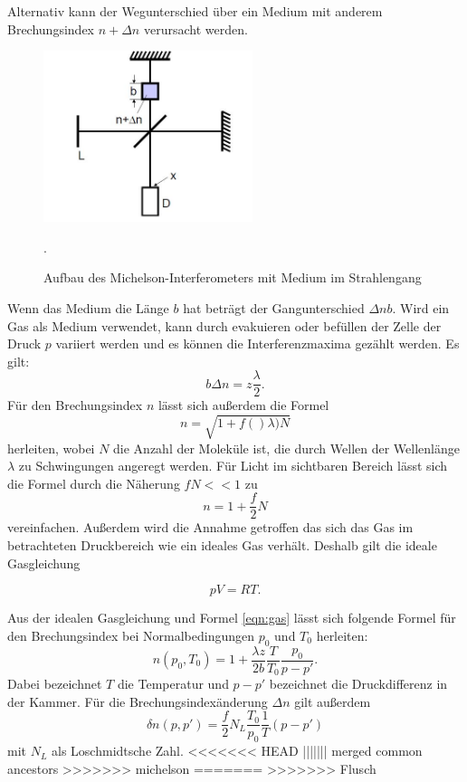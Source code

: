 Alternativ kann der Wegunterschied über ein Medium mit anderem Brechungsindex $n+\Delta n$
verursacht werden.
\begin{figure}[H]
  \centering
  \includegraphics[height=5cm]{gas.JPG}
  \caption{Aufbau des Michelson-Interferometers mit Medium im Strahlengang}
  \label{fig:gas}
  \cite{skript}.
\end{figure}

Wenn das Medium die Länge $b$ hat beträgt der Gangunterschied $\Delta nb$.
Wird ein Gas als Medium verwendet, kann durch evakuieren oder befüllen der Zelle der
Druck $p$ variiert werden und es können die Interferenzmaxima gezählt werden.
Es gilt:
\begin{equation}
  b\Delta n = z \frac{\lambda}{2}
  \label{eqn:gas}.
\end{equation}
Für den Brechungsindex $n$ lässt sich außerdem die Formel
\begin{equation}
  n=\sqrt{1+f()\lambda)N}
\end{equation}
herleiten, wobei $N$ die Anzahl der Moleküle ist, die durch Wellen der Wellenlänge
$\lambda$ zu Schwingungen angeregt werden. Für Licht im sichtbaren Bereich lässt
sich die Formel durch die Näherung $fN<<1$  zu
\begin{equation}
  n=1+\frac{f}{2}N
\end{equation}
vereinfachen.
Außerdem wird die Annahme getroffen das sich das Gas im betrachteten Druckbereich
wie ein ideales Gas verhält. Deshalb gilt die ideale Gasgleichung

\begin{equation}
  pV=RT.
\end{equation}

Aus der idealen Gasgleichung und Formel \ref{eqn:gas} lässt sich folgende Formel für
den Brechungsindex bei Normalbedingungen $p_{0}$ und $T_{0}$ herleiten:
\begin{equation}
  n(p_{0},T_{0})= 1+ \frac{\lambda z}{2b}\frac{T}{T_{0}}\frac{p_{0}}{p-p'}.
  \label{eqn:brech}
\end{equation}
Dabei bezeichnet $T$ die Temperatur und $p-p'$ bezeichnet die Druckdifferenz in der Kammer.
Für die Brechungsindexänderung $\Delta n$ gilt außerdem
\begin{equation}
  \delta n(p,p')= \frac{f}{2}N_{L}\frac{T_{0}}{p_{0}}\frac{1}{T}(p-p')
\end{equation}
mit $N_{L}$ als Loschmidtsche Zahl.
<<<<<<< HEAD
||||||| merged common ancestors
>>>>>>> michelson
=======
>>>>>>> Flusch
